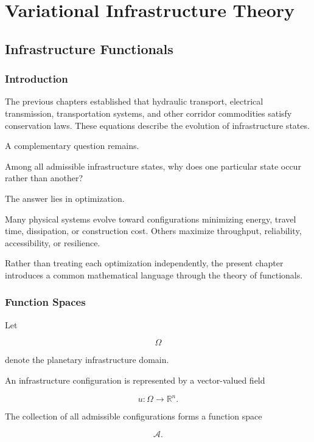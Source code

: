 \documentclass[11pt,fleqn]{book}
\numberwithin{equation}{chapter}
\theoremstyle{plain}
\theoremstyle{definition}
\theoremstyle{remark}
\begin{document}
\part{Variational Infrastructure Theory}

\chapter{Infrastructure Functionals}

\section{Introduction}

The previous chapters established that hydraulic transport,
electrical transmission, transportation systems, and other corridor
commodities satisfy conservation laws. These equations describe the
evolution of infrastructure states.

A complementary question remains.

Among all admissible infrastructure states, why does one particular state
occur rather than another?

The answer lies in optimization.

Many physical systems evolve toward configurations minimizing energy,
travel time, dissipation, or construction cost. Others maximize
throughput, reliability, accessibility, or resilience.

Rather than treating each optimization independently, the present
chapter introduces a common mathematical language through the theory of
functionals.


\section{Function Spaces}

Let

\[
\Omega
\]

denote the planetary infrastructure domain.

An infrastructure configuration is represented by a vector-valued field

\[
u:\Omega\rightarrow\mathbb R^n.
\]

The collection of all admissible configurations forms a function space

\[
\mathcal A.
\]
\end{document}
